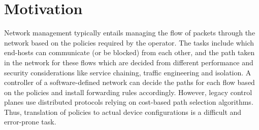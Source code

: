 \section{Motivation}

Network management typically entails managing the flow of packets
through the network based on the policies required by the operator. 
The tasks include which end-hosts can communicate (or be blocked) from
each other, and the path taken in the network for these flows which are
decided from different performance and security considerations like 
service chaining, traffic engineering and isolation. A controller
of a software-defined network can decide the paths for each flow
based on the policies and install forwarding rules accordingly. 
However, legacy control planes use distributed protocols relying on 
cost-based path selection algorithms. Thus, translation of policies to
actual device configurations is a difficult and error-prone task. 


